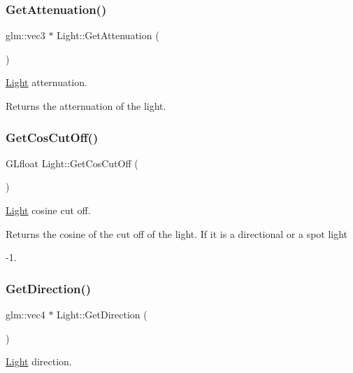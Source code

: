 \subsubsection{\texorpdfstring{Get\+Attenuation()}{GetAttenuation()}}
{\footnotesize\ttfamily glm\+::vec3 $\ast$ Light\+::\+Get\+Attenuation (\begin{DoxyParamCaption}{ }\end{DoxyParamCaption})}



\hyperlink{class_light}{Light} atternuation. 

\begin{DoxyReturn}{Returns}
the atternuation of the light. 
\end{DoxyReturn}
\mbox{\label{class_light_ad1ddee3ac2e66ee13e41544603587393}} 
\subsubsection{\texorpdfstring{Get\+Cos\+Cut\+Off()}{GetCosCutOff()}}
{\footnotesize\ttfamily G\+Lfloat Light\+::\+Get\+Cos\+Cut\+Off (\begin{DoxyParamCaption}{ }\end{DoxyParamCaption})}



\hyperlink{class_light}{Light} cosine cut off. 

\begin{DoxyReturn}{Returns}
the cosine of the cut off of the light. If it is a directional or a spot light 

-\/1. 
\end{DoxyReturn}
\mbox{\label{class_light_a5373bb221bc648c203236d52b787416a}} 
\subsubsection{\texorpdfstring{Get\+Direction()}{GetDirection()}}
{\footnotesize\ttfamily glm\+::vec4 $\ast$ Light\+::\+Get\+Direction (\begin{DoxyParamCaption}{ }\end{DoxyParamCaption})}



\hyperlink{class_light}{Light} direction. 

